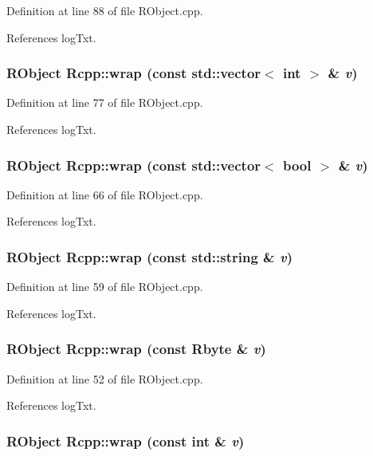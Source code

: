 Definition at line 88 of file RObject.cpp.

References logTxt.\hypertarget{namespaceRcpp_ac7ca672bde8965aacab47395102069e4}{
\subsubsection[{wrap}]{\setlength{\rightskip}{0pt plus 5cm}RObject Rcpp::wrap (const std::vector$<$ int $>$ \& {\em v})}}
\label{namespaceRcpp_ac7ca672bde8965aacab47395102069e4}


Definition at line 77 of file RObject.cpp.

References logTxt.\hypertarget{namespaceRcpp_aa6bc1230d4222365a0ffe0af4cf7fe1a}{
\subsubsection[{wrap}]{\setlength{\rightskip}{0pt plus 5cm}RObject Rcpp::wrap (const std::vector$<$ bool $>$ \& {\em v})}}
\label{namespaceRcpp_aa6bc1230d4222365a0ffe0af4cf7fe1a}


Definition at line 66 of file RObject.cpp.

References logTxt.\hypertarget{namespaceRcpp_a4d366d399dd494d6790a4c18def9e9a9}{
\subsubsection[{wrap}]{\setlength{\rightskip}{0pt plus 5cm}RObject Rcpp::wrap (const std::string \& {\em v})}}
\label{namespaceRcpp_a4d366d399dd494d6790a4c18def9e9a9}


Definition at line 59 of file RObject.cpp.

References logTxt.\hypertarget{namespaceRcpp_a81f3e14c61a58be59803f3100700ea94}{
\subsubsection[{wrap}]{\setlength{\rightskip}{0pt plus 5cm}RObject Rcpp::wrap (const Rbyte \& {\em v})}}
\label{namespaceRcpp_a81f3e14c61a58be59803f3100700ea94}


Definition at line 52 of file RObject.cpp.

References logTxt.\hypertarget{namespaceRcpp_a0a7e3f2732cf247f3d1f0bf005fe5ad9}{
\subsubsection[{wrap}]{\setlength{\rightskip}{0pt plus 5cm}RObject Rcpp::wrap (const int \& {\em v})}}
\label{namespaceRcpp_a0a7e3f2732cf247f3d1f0bf005fe5ad9}


